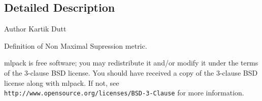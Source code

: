 \subsection{Detailed Description}
\begin{DoxyAuthor}{Author}
Kartik Dutt
\end{DoxyAuthor}
Definition of Non Maximal Supression metric.

mlpack is free software; you may redistribute it and/or modify it under the terms of the 3-\/clause B\+SD license. You should have received a copy of the 3-\/clause B\+SD license along with mlpack. If not, see {\tt http\+://www.\+opensource.\+org/licenses/\+B\+S\+D-\/3-\/\+Clause} for more information. 